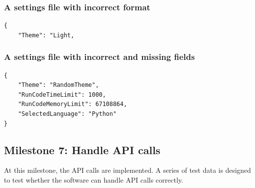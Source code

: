 \documentclass[a4paper]{report}
\begin{document}
\subsubsection{A settings file with incorrect format}
\begin{verbatim}
{
    "Theme": "Light,
\end{verbatim}

\subsubsection{A settings file with incorrect and missing fields}

\begin{verbatim}
{
    "Theme": "RandomTheme",
    "RunCodeTimeLimit": 1000,
    "RunCodeMemoryLimit": 67108864,
    "SelectedLanguage": "Python"
}
\end{verbatim}

\subsection{Milestone 7: Handle API calls}

At this milestone, the API calls are implemented. A series of test data is designed to test whether the software can handle API calls correctly.
\end{document}
